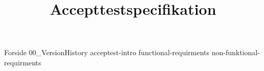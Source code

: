 \documentclass[a4paper,openany]{memoir}
\title{Accepttestspecifikation}
\begin{document}
	{Forside}  \newpage
	\tableofcontents\thispagestyle{fancy}
	{00_VersionHistory}  \newpage
	{acceptest-intro}  \newpage
	{functional-requirments}  \newpage
	{non-funktional-requirments}  \newpage

	 {}
	\printbibliography
\end{document}
